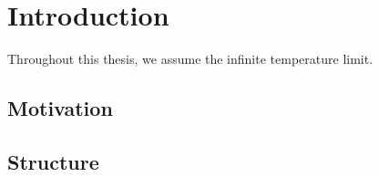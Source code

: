 \chapter{Introduction}
\thispagestyle{chapterBeginStyle}

Throughout this thesis, we assume the infinite temperature limit.
\section{Motivation}

\section{Structure}
